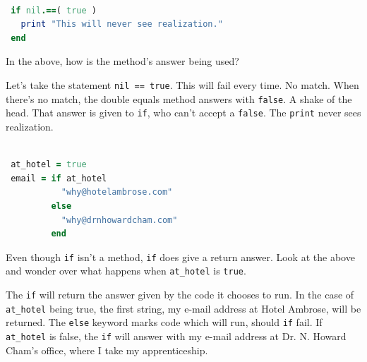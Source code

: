 \documentclass[10pt,twoside]{report}
\begin{document}
\begin{lstlisting}[basicstyle=\ttfamily\color{basiccolor},
    commentstyle = \ttfamily\color{commentcolor},
    keywordstyle=\ttfamily\color{keywordscolor},
    stringstyle=\color{stringcolor},
    language=Ruby,
    basicstyle=\small\ttfamily,
    showstringspaces=false,
  ]

 if nil.==( true )
   print "This will never see realization."  
 end

\end{lstlisting}


In the above, how is the method's answer being used?

Let's take the statement \lstinline[breaklines=true]|nil == true|.
This will fail every time.  No match.  When there's no match, the
double equals method answers with \lstinline[breaklines=true]|false|.
A shake of the head. That answer is given to
\lstinline[breaklines=true]|if|, who can't accept a
\lstinline[breaklines=true]|false|.  The
\lstinline[breaklines=true]|print| never sees realization.


\begin{lstlisting}[basicstyle=\ttfamily\color{basiccolor},
    commentstyle = \ttfamily\color{commentcolor},
    keywordstyle=\ttfamily\color{keywordscolor},
    stringstyle=\color{stringcolor},
    language=Ruby,
    basicstyle=\small\ttfamily,
    showstringspaces=false,
  ]

 at_hotel = true 
 email = if at_hotel 
           "why@hotelambrose.com" 
         else
           "why@drnhowardcham.com" 
         end

\end{lstlisting}


Even though \lstinline[breaklines=true]|if| isn't a method,
\lstinline[breaklines=true]|if| does give a return answer.  Look at
the above and wonder over what happens when
\lstinline[breaklines=true]|at_hotel| is
\lstinline[breaklines=true]|true|.

The \lstinline[breaklines=true]|if| will return the answer given by
the code it chooses to run.  In the case of
\lstinline[breaklines=true]|at_hotel| being true, the first string, my
e-mail address at Hotel Ambrose, will be returned.  The
\lstinline[breaklines=true]|else| keyword marks code which will run,
should \lstinline[breaklines=true]|if| fail.  If
\lstinline[breaklines=true]|at_hotel| is false, the
\lstinline[breaklines=true]|if| will answer with my e-mail address at
Dr. N. Howard Cham's office, where I take my apprenticeship.
\end{document}
